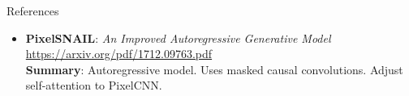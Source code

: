 \begin{frame}{References}
{\begin{itemize}
	\item \textbf{PixelSNAIL}: \textit{An Improved Autoregressive Generative Model} \\
	\href{https://arxiv.org/pdf/1712.09763.pdf}{https://arxiv.org/pdf/1712.09763.pdf} \\
	\textbf{Summary}: Autoregressive model. Uses masked causal convolutions. Adjust self-attention to PixelCNN.
\end{itemize}
}
\end{frame}

 